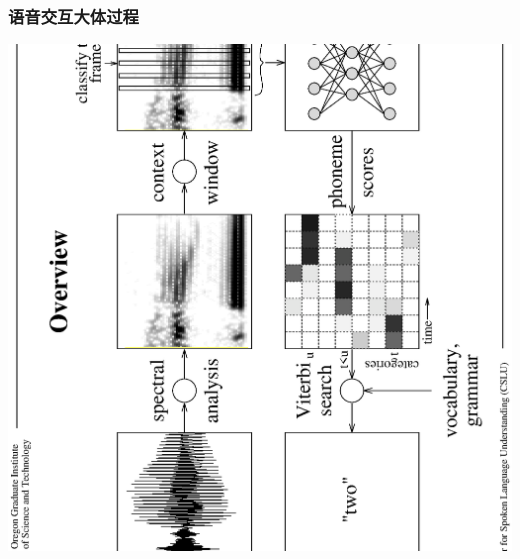\documentclass{beamer}
\newcommand{\fullPageImage}[2]{
	{
		\usebackgroundtemplate{\texttt{[image: \#1]}}
		\frame[plain]{#2}
	}
}
\begin{document}
\begin{frame}
	\frametitle{语音交互大体过程}
	\transwipe
	\begin{center}
	\includegraphics[scale=.26, angle=270]{images/voice-recognition-overview.eps}
	\end{center}
\end{frame}

\fullPageImage{images/schema_tts_work.jpg}{\transwipe}%
\end{document}
